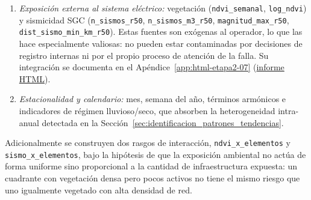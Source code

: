 \begin{enumerate}
    \item \textit{Exposición externa al sistema eléctrico:} vegetación (\texttt{ndvi\_semanal}, \texttt{log\_ndvi}) y sismicidad SGC (\texttt{n\_sismos\_r50}, \texttt{n\_sismos\_m3\_r50}, \texttt{magnitud\_max\_r50}, \texttt{dist\_sismo\_min\_km\_r50}). Estas fuentes son exógenas al operador, lo que las hace especialmente valiosas: no pueden estar contaminadas por decisiones de registro internas ni por el propio proceso de atención de la falla. Su integración se documenta en el Apéndice~\ref{app:html-etapa2-07} (\href{\urlEtapaDosSiete}{informe HTML}).
    \item \textit{Estacionalidad y calendario:} mes, semana del año, términos armónicos e indicadores de régimen lluvioso/seco, que absorben la heterogeneidad intra-anual detectada en la Sección~\ref{sec:identificacion_patrones_tendencias}.
\end{enumerate}

Adicionalmente se construyen dos rasgos de interacción, \texttt{ndvi\_x\_elementos} y \texttt{sismo\_x\_elementos}, bajo la hipótesis de que la exposición ambiental no actúa de forma uniforme sino proporcional a la cantidad de infraestructura expuesta: un cuadrante con vegetación densa pero pocos activos no tiene el mismo riesgo que uno igualmente vegetado con alta densidad de red.

